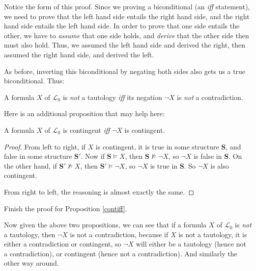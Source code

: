 \begin{remark}
Notice the form of this proof. Since we proving a biconditional (an \textit{iff} statement), we need to prove that the left hand side entails the right hand side, and the right hand side entails the left hand side. In order to prove that one side entails the other, we have to \textit{assume} that one side holds, and \textit{derive} that the other side then must also hold. Thus, we assumed the left hand side and derived the right, then assumed the right hand side, and derived the left. 
\end{remark}

As before, inverting this biconditional by negating both sides also gets us a true biconditional. Thus:

\begin{prop}
A formula $X$ of $\mathcal{L}_0$ is \emph{not} a tautology \textit{iff} its negation $\neg X$ is \emph{not} a contradiction. 
\end{prop}

Here is an additional proposition that may help here:

\begin{prop}
A formula $X$ of $\mathcal{L}_0$ is contingent \textit{iff} $\neg X$ is contingent. \label{contiff}
\end{prop}

\begin{proof}
From left to right, if $X$ is contingent, it is true in some structure $\mathbf{S}$, and false in some structure $\mathbf{S}'$. Now if $\mathbf{S} \models X$, then $\mathbf{S} \not\models \neg X$, so $\neg X$ is false in $\mathbf{S}$. On the other hand, if $\mathbf{S}' \not\models X$, then $\mathbf{S}' \models \neg X$, so $\neg X$ is true in $\mathbf{S}$. So $\neg X$ is also contingent. 

From right to left, the reasoning is almost exactly the same. 
\end{proof}

\begin{exc}
Finish the proof for Proposition \ref{contiff}. 
\end{exc}

Now given the above two propositions, we can see that if a formula $X$ of $\mathcal{L}_0$ is \textit{not} a tautology, then $\neg X$ is not a contradiction, because if $X$ is not a tautology, it is either a contradiction or contingent, so $\neg X$ will either be a tautology (hence not a contradiction), or contingent (hence not a contradiction). And similarly the other way around. 

